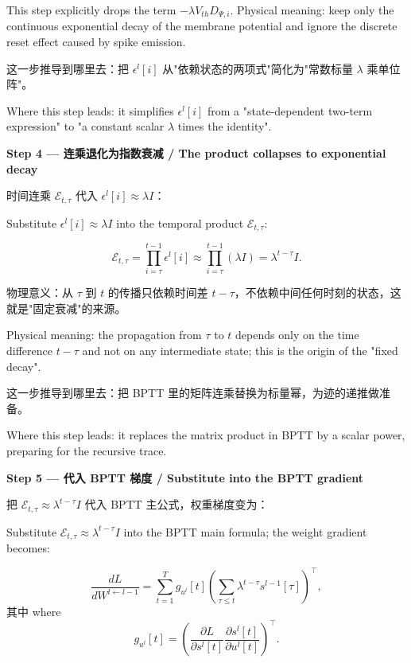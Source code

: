\documentclass[journal,12pt,onecolumn]{IEEEtran}
\begin{document}
This step explicitly drops the term $-\lambda V_{th} D_{\Psi,i}$. Physical meaning: keep only the continuous exponential decay of the membrane potential and ignore the discrete reset effect caused by spike emission.

这一步推导到哪里去：把 $\epsilon^l[i]$ 从"依赖状态的两项式"简化为"常数标量 $\lambda$ 乘单位阵"。

Where this step leads: it simplifies $\epsilon^l[i]$ from a "state-dependent two-term expression" to "a constant scalar $\lambda$ times the identity".

\medskip\noindent\textbf{Step 4 — 连乘退化为指数衰减 / The product collapses to exponential decay}

时间连乘 $\mathcal{E}_{t,\tau}$ 代入 $\epsilon^l[i]\approx\lambda I$：

Substitute $\epsilon^l[i]\approx\lambda I$ into the temporal product $\mathcal{E}_{t,\tau}$:

\begin{equation}
\mathcal{E}_{t,\tau} = \prod_{i=\tau}^{t-1} \epsilon^l[i] \approx \prod_{i=\tau}^{t-1} (\lambda I) = \lambda^{t-\tau} I.
\end{equation}

物理意义：从 $\tau$ 到 $t$ 的传播只依赖时间差 $t-\tau$，不依赖中间任何时刻的状态，这就是"固定衰减"的来源。

Physical meaning: the propagation from $\tau$ to $t$ depends only on the time difference $t-\tau$ and not on any intermediate state; this is the origin of the "fixed decay".

这一步推导到哪里去：把 BPTT 里的矩阵连乘替换为标量幂，为迹的递推做准备。

Where this step leads: it replaces the matrix product in BPTT by a scalar power, preparing for the recursive trace.

\medskip\noindent\textbf{Step 5 — 代入 BPTT 梯度 / Substitute into the BPTT gradient}

把 $\mathcal{E}_{t,\tau}\approx\lambda^{t-\tau}I$ 代入 BPTT 主公式，权重梯度变为：

Substitute $\mathcal{E}_{t,\tau}\approx\lambda^{t-\tau}I$ into the BPTT main formula; the weight gradient becomes:

\begin{equation}
\frac{dL}{dW^{l\leftarrow l-1}} = \sum_{t=1}^{T} g_{u^l}[t] \left( \sum_{\tau\le t} \lambda^{t-\tau} s^{l-1}[\tau] \right)^{\top},
\end{equation}
其中 where
\begin{equation}
g_{u^l}[t] = \left( \frac{\partial L}{\partial s^l[t]} \frac{\partial s^l[t]}{\partial u^l[t]} \right)^{\top}.
\end{equation}
\end{document}
